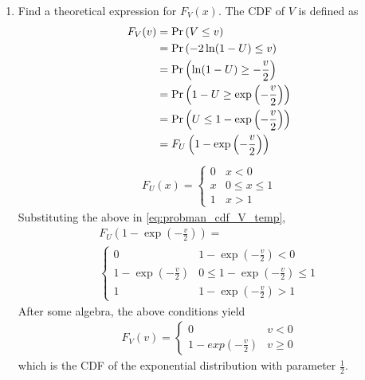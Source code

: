 \documentclass[10pt, a4paper]{article}
\providecommand{\brak}[1]{\ensuremath{\left(#1\right)}}
\begin{document}
\begin{enumerate}
\item Find a theoretical expression for $F_V(x)$.
The CDF of $V$ is defined as 
\begin{align}
    F_V(v) &= \pr{V \le v}\\
           &= \pr{-2 \ln(1-U)\le v} \\
           &= \pr{\ln(1-U) \ge -\frac{v}{2}}\\
           &= \pr{1-U \ge \exp\brak{-\frac{v}{2}}}\\
           &= \pr{U \le 1- \exp\brak{-\frac{v}{2}}}\\
           &= F_U\brak{1- \exp\brak{-\frac{v}{2}}}
\label{eq:probman_cdf_V_temp}
\end{align}
\begin{align}
F_U(x) = 
\begin{cases}
0 &  x < 0 \\
x & 0 \le x \le 1 \\
1 & x > 1
\end{cases}
\end{align}
%
Substituting the above in \eqref{eq:probman_cdf_V_temp},
%
\begin{multline}
F_U\brak{1- \exp\brak{-\frac{v}{2}}} =
\\
\begin{cases}
0 &  1- \exp\brak{-\frac{v}{2}} < 0 \\
1- \exp\brak{-\frac{v}{2}} & 0 \le 1- \exp\brak{-\frac{v}{2}} \le 1 \\
1 & 1- \exp\brak{-\frac{v}{2}} > 1
\end{cases}
\end{multline}
%
After some algebra, the above conditions yield
\begin{align}
F_V(v) = 
\begin{cases}
0 & v < 0 \\
1- exp\brak{-\frac{v}{2}} & v \ge 0
\end{cases}
\label{eq:probman_V_cdf_anal}
\end{align}
%
which is the CDF of the exponential distribution with parameter $\frac{1}{2}$. 
\end{enumerate}
\end{document}
